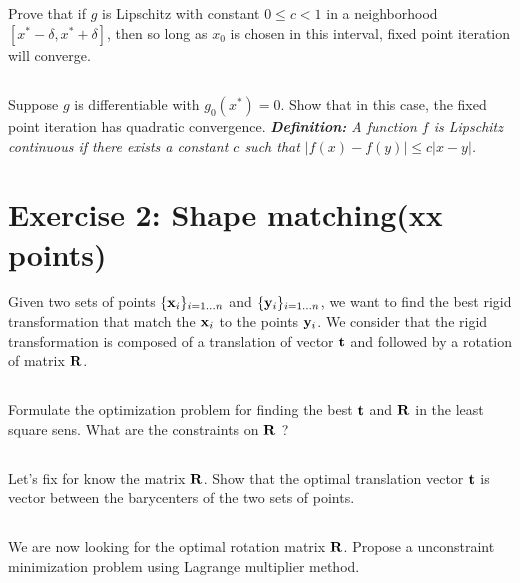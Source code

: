 \subsection{} Prove that if $g$ is Lipschitz with constant $0 \leq c < 1$ in a neighborhood $[x^* - \delta, x^* + \delta]$, then so long as $x_0$ is chosen in this interval, fixed point iteration will converge.

\subsection{} Suppose $g$ is differentiable with $g_0(x^*) = 0$. Show that in this case, the fixed point iteration has quadratic convergence.\newline
\newline
\emph{\textbf{Definition:} A function $f$ is Lipschitz continuous if there exists a constant $c$ such that $|f(x) - f(y)| \leq c|x - y|$.} 

\begin{correction}
\end{correction}


\section*{Exercise 2: Shape matching\normalsize \textnormal(xx points)}

Given two sets of points $\{{\bf x}_i\}_{i = 1\hdots n}$ and $\{{\bf y}_i\}_{i = 1\hdots n}$, we want to find the best rigid transformation that match the ${\bf x}_i$ to the points ${\bf y}_i$. We consider that the rigid transformation is composed of a translation of vector ${\bf t}$ and followed by a rotation of matrix ${\bf R}$.

\subsection{} Formulate the optimization problem for finding the best ${\bf t}$ and ${\bf R}$ in the least square sens. What are the constraints on ${\bf R}$ ?

\subsection{} Let's fix for know the matrix ${\bf R}$. Show that the optimal translation vector ${\bf t}$ is vector between the barycenters of the two sets of points.

\subsection{} We are now looking for the optimal rotation matrix ${\bf R}$. Propose a unconstraint minimization problem using Lagrange multiplier method. 
